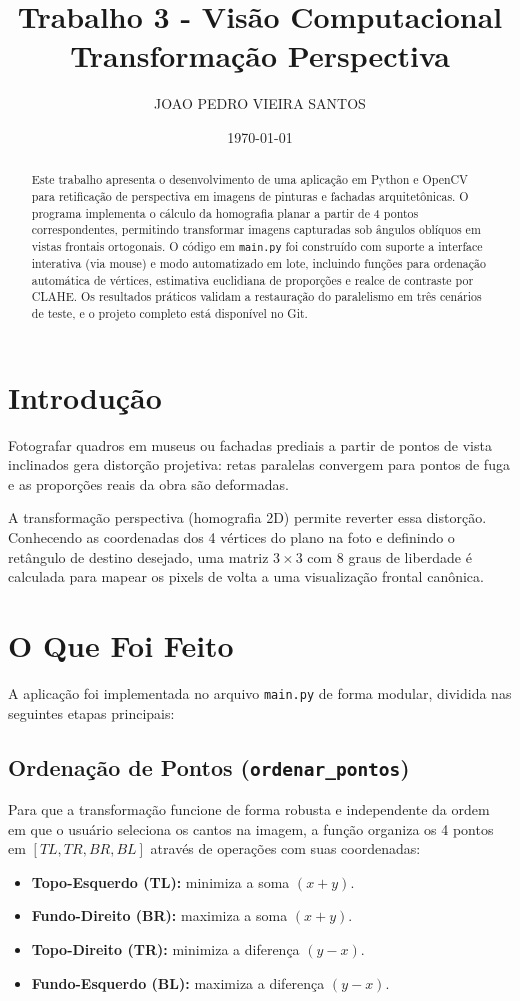 \documentclass[twocolumn]{article}
\title{Trabalho 3 - Visão Computacional \\ \large Transformação Perspectiva}
\author{JOAO PEDRO VIEIRA SANTOS}
\date{\today}
\begin{document}
\maketitle

\begin{abstract}
Este trabalho apresenta o desenvolvimento de uma aplicação em Python e OpenCV para retificação de perspectiva em imagens de pinturas e fachadas arquitetônicas. O programa implementa o cálculo da homografia planar a partir de 4 pontos correspondentes, permitindo transformar imagens capturadas sob ângulos oblíquos em vistas frontais ortogonais. O código em \texttt{main.py} foi construído com suporte a interface interativa (via mouse) e modo automatizado em lote, incluindo funções para ordenação automática de vértices, estimativa euclidiana de proporções e realce de contraste por CLAHE. Os resultados práticos validam a restauração do paralelismo em três cenários de teste, e o projeto completo está disponível no Git.
\end{abstract}

\section{Introdução}
Fotografar quadros em museus ou fachadas prediais a partir de pontos de vista inclinados gera distorção projetiva: retas paralelas convergem para pontos de fuga e as proporções reais da obra são deformadas.

A transformação perspectiva (homografia 2D) permite reverter essa distorção. Conhecendo as coordenadas dos 4 vértices do plano na foto e definindo o retângulo de destino desejado, uma matriz $3 \times 3$ com 8 graus de liberdade é calculada para mapear os pixels de volta a uma visualização frontal canônica.

\section{O Que Foi Feito}
A aplicação foi implementada no arquivo \texttt{main.py} de forma modular, dividida nas seguintes etapas principais:

\subsection{Ordenação de Pontos (\texttt{ordenar\_pontos})}
Para que a transformação funcione de forma robusta e independente da ordem em que o usuário seleciona os cantos na imagem, a função organiza os 4 pontos em $[TL, TR, BR, BL]$ através de operações com suas coordenadas:
\begin{itemize}
    \item \textbf{Topo-Esquerdo (TL):} minimiza a soma $(x + y)$.
    \item \textbf{Fundo-Direito (BR):} maximiza a soma $(x + y)$.
    \item \textbf{Topo-Direito (TR):} minimiza a diferença $(y - x)$.
    \item \textbf{Fundo-Esquerdo (BL):} maximiza a diferença $(y - x)$.
\end{itemize}
\end{document}
